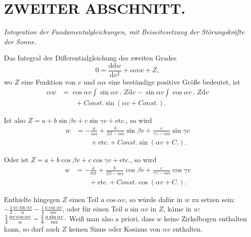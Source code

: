 \clearpage
\begingroup
{}
\renewcommand{\headrulewidth}{0pt}
\section*{ZWEITER ABSCHNITT.}
\begin{center}
\itshape Integration der Fundamentalgleichungen, mit Beiseitesetzung der
Störungskräfte der Sonne.
\end{center}

\par\noindent\hspace*{\parindent}

\par\noindent\hspace*{\parindent}Das Integral der Differentialgleichung des zweiten Grades
\[
0=\frac{\mathrm{dd}w}{\mathrm{d}v^2}+\alpha\alpha w+Z,
\]
\noindent wo \(Z\) eine Funktion von \(v\) und \(\alpha\alpha\) eine beständige
positive Größe bedeutet, ist
\[
\begin{aligned}
\alpha w&=\cos\alpha v\int\sin\alpha v\mathpunct{.}\,Z\mathrm{d}v
 -\sin\alpha v\int\cos\alpha v\mathpunct{.}\,Z\mathrm{d}v\\
 &\qquad+\mathit{Const.}\sin(\alpha v+\mathit{Const.}).
\end{aligned}
\]

\par\noindent\hspace*{\parindent}Ist also \(Z=a+b\sin\beta v+c\sin\gamma v+\mathrm{etc.}\), so wird
\[
\begin{aligned}
w&=-\frac{a}{\alpha\alpha}+\frac{b}{\beta\beta-\alpha\alpha}\sin\beta v
 +\frac{c}{\gamma\gamma-\alpha\alpha}\sin\gamma v\\
 &\qquad+\mathrm{etc.}+\mathit{Const.}\sin(\alpha v+C.).
\end{aligned}
\]

\par\noindent Oder ist \(Z=a+b\cos\beta v+c\cos\gamma v+\mathrm{etc.}\), so wird
\[
\begin{aligned}
w&=-\frac{a}{\alpha\alpha}+\frac{b}{\beta\beta-\alpha\alpha}\cos\beta v
 +\frac{c}{\gamma\gamma-\alpha\alpha}\cos\gamma v\\
 &\qquad+\mathrm{etc.}+\mathit{Const.}\cos(\alpha v+C.).
\end{aligned}
\]

\par\noindent\hspace*{\parindent}Enthielte hingegen \(Z\) einen Teil \(a\cos\alpha v\), so würde dafür in
\(w\) zu setzen sein: \(-\tfrac12\frac{av\sin\alpha v}{\alpha}
-\tfrac14\frac{a\cos\alpha v}{\alpha\alpha}\), oder für einen Teil
\(a\sin\alpha v\) in \(Z\), käme in \(w\):
\(\tfrac12\frac{av\cos\alpha v}{\alpha}
-\tfrac14\frac{a\sin\alpha v}{\alpha\alpha}\mathpunct{\raisebox{.4ex}{.}}\)
Weiß man also a priori, dass \(w\) keine Zirkelbogen enthalten kann, so darf
auch \(Z\) keinen Sinus oder Kosinus von \(\alpha v\) enthalten.

